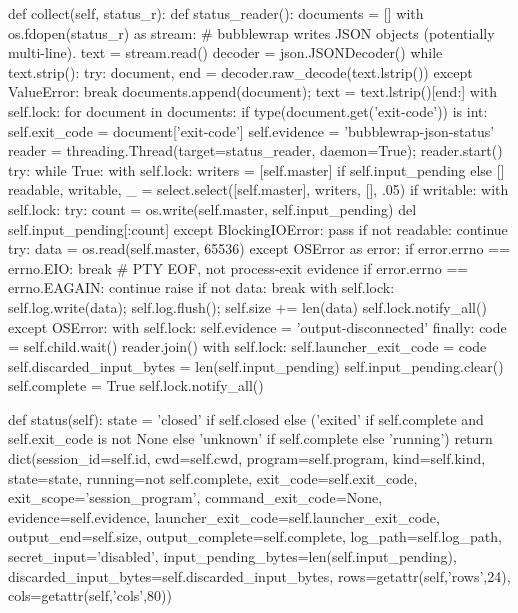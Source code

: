     def collect(self, status_r):
        def status_reader():
            documents = []
            with os.fdopen(status_r) as stream:
                # bubblewrap writes JSON objects (potentially multi-line).
                text = stream.read()
            decoder = json.JSONDecoder()
            while text.strip():
                try:
                    document, end = decoder.raw_decode(text.lstrip())
                except ValueError:
                    break
                documents.append(document); text = text.lstrip()[end:]
            with self.lock:
                for document in documents:
                    if type(document.get('exit-code')) is int:
                        self.exit_code = document['exit-code']
                        self.evidence = 'bubblewrap-json-status'
        reader = threading.Thread(target=status_reader, daemon=True); reader.start()
        try:
            while True:
                with self.lock: writers = [self.master] if self.input_pending else []
                readable, writable, _ = select.select([self.master], writers, [], .05)
                if writable:
                    with self.lock:
                        try:
                            count = os.write(self.master, self.input_pending)
                            del self.input_pending[:count]
                        except BlockingIOError: pass
                if not readable:
                    continue
                try:
                    data = os.read(self.master, 65536)
                except OSError as error:
                    if error.errno == errno.EIO: break  # PTY EOF, not process-exit evidence
                    if error.errno == errno.EAGAIN: continue
                    raise
                if not data: break
                with self.lock:
                    self.log.write(data); self.log.flush(); self.size += len(data)
                    self.lock.notify_all()
        except OSError:
            with self.lock: self.evidence = 'output-disconnected'
        finally:
            code = self.child.wait()
            reader.join()
            with self.lock:
                self.launcher_exit_code = code
                self.discarded_input_bytes = len(self.input_pending)
                self.input_pending.clear()
                self.complete = True
                self.lock.notify_all()

    def status(self):
        state = 'closed' if self.closed else ('exited' if self.complete and self.exit_code is not None else
                'unknown' if self.complete else 'running')
        return dict(session_id=self.id, cwd=self.cwd, program=self.program, kind=self.kind,
            state=state, running=not self.complete, exit_code=self.exit_code,
            exit_scope='session_program', command_exit_code=None, evidence=self.evidence,
            launcher_exit_code=self.launcher_exit_code, output_end=self.size,
            output_complete=self.complete, log_path=self.log_path, secret_input='disabled',
            input_pending_bytes=len(self.input_pending), discarded_input_bytes=self.discarded_input_bytes,
            rows=getattr(self,'rows',24), cols=getattr(self,'cols',80))

